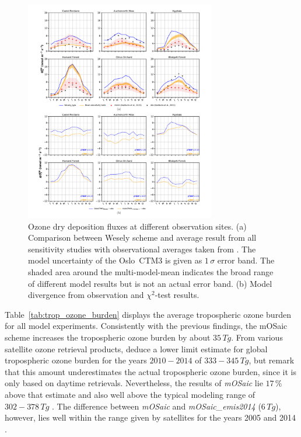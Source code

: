 \documentclass[gmd, manuscript]{copernicus}
\begin{document}
%
\begin{figure}[t]
  \includegraphics[width=8.3cm]{fig09}
  \caption{Ozone dry deposition fluxes at different observation sites. (a) Comparison between Wesely scheme and average result from all sensitivity studies with observational averages taken from \citet{ACP:Hardacre2015}. The model uncertainty of the Oslo~CTM3 is given as $1\,\sigma$ error band. The shaded area around the multi-model-mean indicates the broad range of different model results but is not an actual error band. (b) Model divergence from observation and $\chi^2$-test results.}
  \label{fig:mmm_drydep_stations}
\end{figure}

Table~\ref{tab:trop_ozone_burden} displays the average tropospheric ozone burden for all model experiments. Consistently with the previous findings, the mOSaic scheme increases the tropospheric ozone burden by about $35\,\unit{Tg}$. From various satellite ozone retrieval products, \citet[][Tab.~5]{ESA:Gaudel2018} deduce a lower limit estimate for global tropospheric ozone burden for the years $2010-2014$ of $333-345\,\unit{Tg}$, but remark that this amount underestimates the actual tropospheric ozone burden, since it is only based on daytime retrievals. Nevertheless, the results of \emph{mOSaic} lie $17\,\unit{\%}$ above that estimate and also well above the typical modeling range of $302-378\,\unit{Tg}$ \citep{ACP:Young2013}. The difference between \emph{mOSaic} and \emph{mOSaic\_emis2014} ($6\,\unit{Tg}$), however, lies well within the range given by satellites for the years 2005 and 2014 \citep[][Fig.~26]{ESA:Gaudel2018}.
\end{document}
